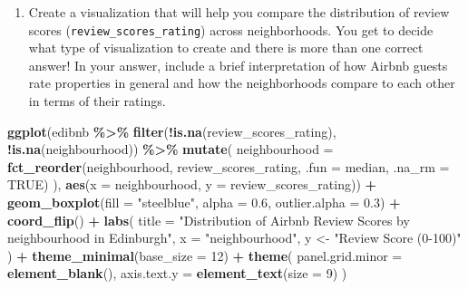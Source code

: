 \documentclass[
]{article}
\newenvironment{Shaded}{\begin{snugshade}}{\end{snugshade}}
\newcommand{\AttributeTok}[1]{\textcolor[rgb]{0.13,0.29,0.53}{#1}}
\newcommand{\ConstantTok}[1]{\textcolor[rgb]{0.56,0.35,0.01}{#1}}
\newcommand{\DecValTok}[1]{\textcolor[rgb]{0.00,0.00,0.81}{#1}}
\newcommand{\FloatTok}[1]{\textcolor[rgb]{0.00,0.00,0.81}{#1}}
\newcommand{\FunctionTok}[1]{\textcolor[rgb]{0.13,0.29,0.53}{\textbf{#1}}}
\newcommand{\NormalTok}[1]{#1}
\newcommand{\OtherTok}[1]{\textcolor[rgb]{0.56,0.35,0.01}{#1}}
\newcommand{\SpecialCharTok}[1]{\textcolor[rgb]{0.81,0.36,0.00}{\textbf{#1}}}
\newcommand{\StringTok}[1]{\textcolor[rgb]{0.31,0.60,0.02}{#1}}
\providecommand{\tightlist}{%
  \setlength{\itemsep}{0pt}\setlength{\parskip}{0pt}}
\begin{document}
\begin{enumerate}
\def\labelenumi{\arabic{enumi}.}
\setcounter{enumi}{4}
\tightlist
\item
  Create a visualization that will help you compare the distribution of
  review scores (\texttt{review\_scores\_rating}) across neighborhoods.
  You get to decide what type of visualization to create and there is
  more than one correct answer! In your answer, include a brief
  interpretation of how Airbnb guests rate properties in general and how
  the neighborhoods compare to each other in terms of their ratings.
\end{enumerate}

\begin{Shaded}
\begin{Highlighting}[]
\FunctionTok{ggplot}\NormalTok{(edibnb }\SpecialCharTok{\%\textgreater{}\%}
  \FunctionTok{filter}\NormalTok{(}\SpecialCharTok{!}\FunctionTok{is.na}\NormalTok{(review\_scores\_rating), }\SpecialCharTok{!}\FunctionTok{is.na}\NormalTok{(neighbourhood)) }\SpecialCharTok{\%\textgreater{}\%}
  \FunctionTok{mutate}\NormalTok{(}
    \AttributeTok{neighbourhood =} \FunctionTok{fct\_reorder}\NormalTok{(neighbourhood, review\_scores\_rating, }\AttributeTok{.fun =}\NormalTok{ median, }\AttributeTok{.na\_rm =} \ConstantTok{TRUE}\NormalTok{)}
\NormalTok{  ), }\FunctionTok{aes}\NormalTok{(}\AttributeTok{x =}\NormalTok{ neighbourhood, }\AttributeTok{y =}\NormalTok{ review\_scores\_rating)) }\SpecialCharTok{+}
  \FunctionTok{geom\_boxplot}\NormalTok{(}\AttributeTok{fill =} \StringTok{"steelblue"}\NormalTok{, }\AttributeTok{alpha =} \FloatTok{0.6}\NormalTok{, }\AttributeTok{outlier.alpha =} \FloatTok{0.3}\NormalTok{) }\SpecialCharTok{+}
  \FunctionTok{coord\_flip}\NormalTok{() }\SpecialCharTok{+}
  \FunctionTok{labs}\NormalTok{(}
    \AttributeTok{title =} \StringTok{"Distribution of Airbnb Review Scores by neighbourhood in Edinburgh"}\NormalTok{,}
    \AttributeTok{x =} \StringTok{"neighbourhood"}\NormalTok{,}
\NormalTok{    y }\OtherTok{\textless{}{-}} \StringTok{"Review Score (0{-}100)"}
\NormalTok{  ) }\SpecialCharTok{+}
  \FunctionTok{theme\_minimal}\NormalTok{(}\AttributeTok{base\_size =} \DecValTok{12}\NormalTok{) }\SpecialCharTok{+}
  \FunctionTok{theme}\NormalTok{(}
    \AttributeTok{panel.grid.minor =} \FunctionTok{element\_blank}\NormalTok{(),}
    \AttributeTok{axis.text.y =} \FunctionTok{element\_text}\NormalTok{(}\AttributeTok{size =} \DecValTok{9}\NormalTok{)}
\NormalTok{  )}
\end{Highlighting}
\end{Shaded}
\end{document}
